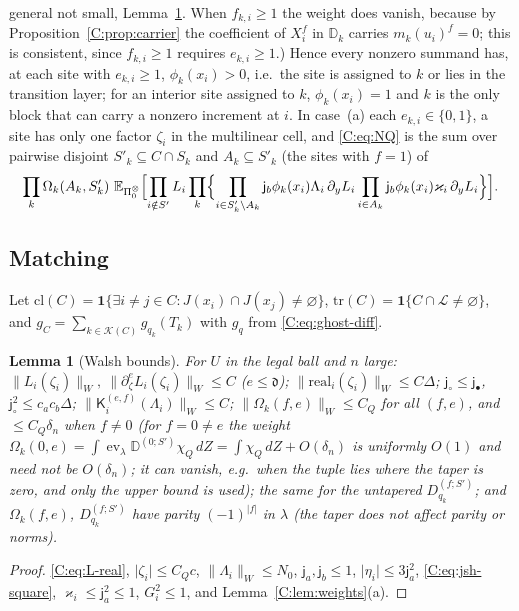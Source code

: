 \documentclass[11pt]{article}
\newtheorem{lemma}[lemma]{Lemma}
\DeclareMathOperator{\ev}{ev}
\newcommand{\E}{\mathbb{E}}
\newcommand{\cK}{\mathcal{K}}
\newcommand{\norm}[1]{\lVert #1\rVert}
\newcommand{\abs}[1]{\lvert #1\rvert}
\newcommand{\one}{\mathbf{1}}
\newcommand{\ja}{\mathsf{j}_a}
\newcommand{\jb}{\mathsf{j}_b}
\newcommand{\jsh}{\mathsf{j}_\circ}
\newcommand{\jfi}{\mathsf{j}_\bullet}
\newcommand{\dg}{\mathfrak{d}}
\newcommand{\K}{\mathsf{K}}
\newcommand{\real}{\mathrm{real}}
\begin{document}
general not small, Lemma~\ref{C:lem:walsh-bounds}.  When \(f_{k,i}\ge1\) the weight does
vanish, because by Proposition~\ref{C:prop:carrier} the coefficient of
\(X_i^{f}\) in \(\mathbb D_k\) carries \(m_k(u_i)^{f}=0\); this is consistent,
since \(f_{k,i}\ge1\) requires \(e_{k,i}\ge1\).)  Hence every nonzero
summand has, at each site with \(e_{k,i}\ge1\), \(\phi_k(x_i)>0\), i.e.\
the site is assigned to \(k\) or lies in the transition layer; for an
interior site assigned to \(k\), \(\phi_k(x_i)=1\) and \(k\) is the only
block that can carry a nonzero increment at \(i\).  In case~(a) each \(e_{k,i}\in\{0,1\}\),
a site has only one factor \(\zeta_i\) in the multilinear cell, and
\eqref{C:eq:NQ} is the sum over pairwise disjoint \(S'_k\subseteq C\cap S_k\)
and \(A_k\subseteq S'_k\) (the sites with \(f=1\)) of
\[
 \prod_k\Omega_k(A_k,S'_k)\
 \E_{\Pi_0^\otimes}\Bigl[\prod_{i\notin S'}L_i\prod_k\Bigl\{\prod_{i\in S'_k\setminus A_k}\jb\phi_k(x_i)\Lambda_i\,\partial_yL_i
 \prod_{i\in A_k}\jb\phi_k(x_i)\varkappa_i\,\partial_yL_i\Bigr\}\Bigr].
\]

\subsection{Matching}
Let \(\mathrm{cl}(C)=\one\{\exists i\ne j\in C: J(x_i)\cap J(x_j)\ne\varnothing\}\),
\(\mathrm{tr}(C)=\one\{C\cap\mathcal L\ne\varnothing\}\), and
\(g_C=\sum_{k\in\cK(C)}g_{q_k}(T_k)\) with \(g_q\) from \eqref{C:eq:ghost-diff}.

\begin{lemma}[Walsh bounds]\label{C:lem:walsh-bounds}
For \(U\) in the legal ball and \(n\) large:
\(\norm{L_i(\zeta_i)}_W,\ \norm{\partial_\zeta^eL_i(\zeta_i)}_W\le C\) (\(e\le\dg\));
\(\norm{\real_i(\zeta_i)}_W\le C\Delta\); \(\jsh\le\jfi\), \(\jsh^2\le c_ac_b\Delta\);
\(\norm{\K_i^{(e,f)}(\Lambda_i)}_W\le C\);
\(\norm{\Omega_k(f,e)}_W\le C_Q\) for all \((f,e)\), and \(\le C_Q\delta_n\)
when \(f\ne0\) (for \(f=0\ne e\) the weight
\(\Omega_k(0,e)=\int\ev_\lambda\mathbb D^{(0;S')}\chi_Q\,dZ=\int\chi_Q\,dZ+O(\delta_n)\)
is uniformly \(O(1)\) and need not be \(O(\delta_n)\); it can vanish, e.g.\
when the tuple lies where the taper is zero, and only the upper bound is
used); the same for the untapered \(D^{(f;S')}_{q_k}\); and \(\Omega_k(f,e)\),
\(D^{(f;S')}_{q_k}\) have parity \((-1)^{\abs f}\) in \(\lambda\) (the taper
does not affect parity or norms).
\end{lemma}
\begin{proof}
\eqref{C:eq:L-real}, \(\abs{\zeta_i}\le C_Qc\), \(\norm{\Lambda_i}_W\le N_0\),
\(\ja,\jb\le1\), \(\abs{\eta_i}\le3\ja^2\), \eqref{C:eq:jsh-square},
\(\varkappa_i\le\ja^2\le1\), \(G_i^2\le1\), and Lemma~\ref{C:lem:weights}(a).
\end{proof}
\end{document}
